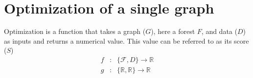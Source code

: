 \documentclass[11pt]{article}
\begin{document}
\section{Optimization of a single graph}\label{Optimization of a single graph}

Optimization is a function that takes a graph ($G$), here a forest $F$, and data ($D$) as inputs and returns a numerical value.  
This value can be referred to as its score ($S$)
 	\begin{eqnarray*}
 		f & : &  \{\mathcal{F}, D\} \rightarrow \mathbb{R}\\
		g & : & \{  \mathbb{R},  \mathbb{R} \} \rightarrow \mathbb{R}
	 \end{eqnarray*}
 

\newpage
\singlespacing

%


%
\end{document}
